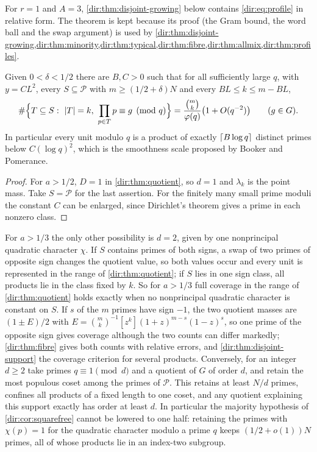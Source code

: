 For $r=1$ and $A=3$, \cref{dir:thm:disjoint-growing} below contains \eqref{dir:eq:profile} in relative form. The
theorem is kept because its proof (the Gram bound, the word ball and the swap argument) is used by
\cref{dir:thm:disjoint-growing,dir:thm:minority,dir:thm:typical,dir:thm:fibre,dir:thm:allmix,dir:thm:profiles}.

\begin{corollary}\label{dir:cor:squarefree}
Given $0<\delta<1/2$ there are $B,C>0$ such that for all sufficiently large $q$, with $y=CL^2$,
every $S\subseteq\mathcal P$ with $m\ge(1/2+\delta)N$ and every $BL\le k\le m-BL$,
\[
 \#\Bigl\{T\subseteq S:\ \abs T=k,\ \prod_{p\in T}p\equiv g\pmod q\Bigr\}
 =\frac{\binom mk}{\varphi(q)}\bigl(1+O(q^{-2})\bigr)\qquad(g\in G).
\]
In particular every unit modulo $q$ is a product of exactly $\lceil B\log q\rceil$ distinct primes
below $C(\log q)^2$, which is the smoothness scale proposed by Booker and Pomerance.
\end{corollary}

\begin{proof}
For $a>1/2$, $D=1$ in \cref{dir:thm:quotient}, so $d=1$ and $\lambda_k$ is the point mass. Take
$S=\mathcal P$ for the last assertion. For the finitely many small prime moduli the constant $C$
can be enlarged, since Dirichlet's theorem gives a prime in each nonzero class.
\end{proof}

\begin{remark}\label{dir:rem:thresholds}
For $a>1/3$ the only other possibility is $d=2$, given by one nonprincipal quadratic character
$\chi$. If $S$ contains primes of both signs, a swap of two primes of opposite sign changes the
quotient value, so both values occur and every unit is represented in the range of
\cref{dir:thm:quotient}; if $S$ lies in one sign class, all products lie in the class fixed by $k$.
So for $a>1/3$ full coverage in the range of \cref{dir:thm:quotient} holds exactly when no
nonprincipal quadratic character is constant on $S$. If $s$ of the $m$ primes have sign $-1$, the two quotient masses are
$(1\pm E)/2$ with $E=\binom mk^{-1}[z^k](1+z)^{m-s}(1-z)^s$, so one prime of the opposite sign gives
coverage although the two counts can differ markedly; \cref{dir:thm:fibre} gives both counts with
relative errors, and \cref{dir:thm:disjoint-support} the coverage criterion for several products.
Conversely, for an integer $d\ge2$ take primes
$q\equiv1\pmod d$ and a quotient of $G$ of order $d$, and retain the most populous coset among
the primes of $\mathcal P$. This retains at least $N/d$ primes, confines all products of a fixed
length to one coset, and any quotient explaining this support exactly has order at least $d$.
In particular the majority hypothesis of \cref{dir:cor:squarefree} cannot be lowered to one
half: retaining the primes with $\chi(p)=1$ for the quadratic character modulo a prime $q$
keeps $(1/2+o(1))N$ primes, all of whose products lie in an index-two subgroup.
\end{remark}

